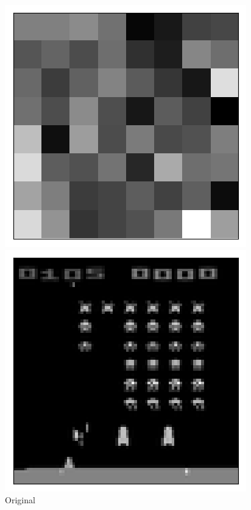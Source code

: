 \begin{figure}[h!]
\begin{multicols}{4}
    \caption{$\beta=2$}
    \includegraphics[scale=0.4]{figures/results/latent_image/beta_4_sample_30_latent.png}
    \caption{$\beta=4$}
\end{multicols}
\begin{multicols}{4}
    \includegraphics[scale=0.4]{figures/results/latent_image/beta_1_sample_90_original.png}
    \caption{Original}

\end{multicols}
\end{figure}
